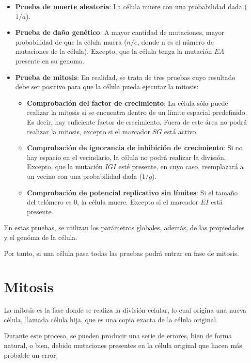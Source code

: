 \begin{itemize}
    \item \textbf{Prueba de muerte aleatoria}: La célula muere con una probabilidad dada ($1/a$).
    \item \textbf{Prueba de daño genético}: A mayor cantidad de mutaciones, mayor probabilidad de
    que la célula muera ($n/e$, donde n es el número de mutaciones de la célula). Excepto, que
    la célula tenga la mutación $EA$ presente en su genoma.
    \item \textbf{Prueba de mitosis}: En realidad, se trata de tres pruebas cuyo resultado debe
    ser positivo para que la célula pueda ejecutar la mitosis:
    \begin{itemize}
        \item \textbf{Comprobación del factor de crecimiento}: La célula sólo puede realizar la
        mitosis si se encuentra dentro de un límite espacial predefinido. Es decir, hay suficiente
        factor de crecimiento. Fuera de este área no podrá realizar la mitosis, excepto si el
        marcador $SG$ está activo.
        \item \textbf{Comprobación de ignorancia de inhibición de crecimiento}: Si no hay
        espacio en el vecindario, la célula no podrá realizar la división. Excepto, que
        la mutación $IGI$ esté presente, en cuyo caso, reemplazará a un vecino con una
        probabilidad dada ($1/g$).
        \item \textbf{Comprobación de potencial replicativo sin límites}: Si el tamaño del telómero
        es 0, la célula muere. Excepto si el marcador $EI$ está presente.
    \end{itemize}
\end{itemize}

En estas pruebas, se utilizan los parámetros globales, además, de las propiedades y el genóma de la célula.

Por tanto, si una célula pasa todas las pruebas podrá entrar en fase de mitosis.

\section{Mitosis}

La mitosis es la fase donde se realiza la división celular, lo cual origina una nueva célula, llamada
célula hija, que es una copia exacta de la célula original.

Durante este proceso, se pueden producir una serie de errores, bien de forma natural, o bien, debido
mutaciones presentes en la célula original que hacen más probable un error.

